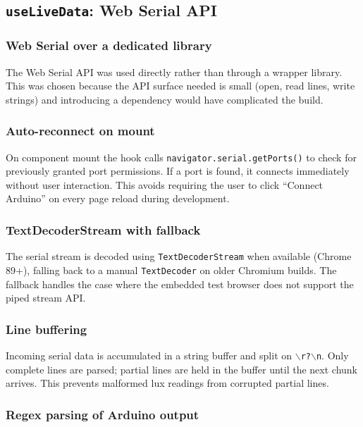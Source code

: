 \documentclass[12pt,letterpaper]{article}
\begin{document}
\subsection{\texttt{useLiveData}: Web Serial API}

\subsubsection{Web Serial over a dedicated library}

The Web Serial API was used directly rather than through a wrapper library.
This was chosen because the API surface needed is small (open, read lines,
write strings) and introducing a dependency would have complicated the build.

\subsubsection{Auto-reconnect on mount}

On component mount the hook calls \texttt{navigator.serial.getPorts()} to check
for previously granted port permissions. If a port is found, it connects
immediately without user interaction. This avoids requiring the user to click
``Connect Arduino'' on every page reload during development.

\subsubsection{TextDecoderStream with fallback}

The serial stream is decoded using \texttt{TextDecoderStream} when available
(Chrome 89+), falling back to a manual \texttt{TextDecoder} on older Chromium
builds. The fallback handles the case where the embedded test browser does not
support the piped stream API.

\subsubsection{Line buffering}

Incoming serial data is accumulated in a string buffer and split on
\texttt{$\backslash$r?$\backslash$n}. Only complete lines are parsed; partial
lines are held in the buffer until the next chunk arrives. This prevents
malformed lux readings from corrupted partial lines.

\subsubsection{Regex parsing of Arduino output}
\end{document}
